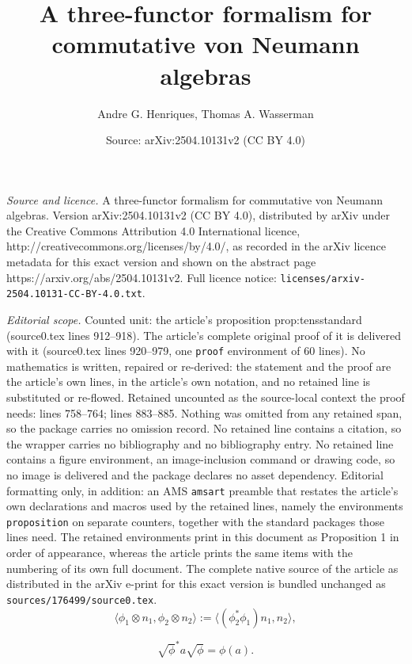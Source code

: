 \documentclass[10pt,a4paper]{amsart}
\title{A three-functor formalism for commutative von Neumann algebras}
\author{Andre G. Henriques, Thomas A. Wasserman}
\date{Source: arXiv:2504.10131v2 (CC BY 4.0)}
\begin{document}
\maketitle

\noindent\emph{Source and licence.} A three-functor formalism for commutative von Neumann algebras. Version arXiv:2504.10131v2 (CC BY 4.0), distributed by arXiv under the Creative Commons Attribution 4.0 International licence, http://creativecommons.org/licenses/by/4.0/, as recorded in the arXiv licence metadata for this exact version and shown on the abstract page https://arxiv.org/abs/2504.10131v2. Full licence notice: \texttt{licenses/arxiv-2504.10131-CC-BY-4.0.txt}.\par\smallskip

\noindent\textit{Editorial scope.} Counted unit: the article's proposition prop:tensstandard (source0.tex lines 912--918). The article's complete original proof of it is delivered with it (source0.tex lines 920--979, one \texttt{proof} environment of 60 lines). No mathematics is written, repaired or re-derived: the statement and the proof are the article's own lines, in the article's own notation, and no retained line is substituted or re-flowed.  Retained uncounted as the source-local context the proof needs: lines 758--764; lines 883--885.  Nothing was omitted from any retained span, so the package carries no omission record.  No retained line contains a citation, so the wrapper carries no bibliography and no bibliography entry.  No retained line contains a figure environment, an image-inclusion command or drawing code, so no image is delivered and the package declares no asset dependency.  Editorial formatting only, in addition: an AMS \texttt{amsart} preamble that restates the article's own declarations and macros used by the retained lines, namely the environments \texttt{proposition} on separate counters, together with the standard packages those lines need.  The retained environments print in this document as Proposition 1 in order of appearance, whereas the article prints the same items with the numbering of its own full document.  The complete native source of the article as distributed in the arXiv e-print for this exact version is bundled unchanged as \texttt{sources/176499/source0.tex}.
\begin{equation}\label{e:innerprodonfusion}
    \langle
\phi_1\otimes n_1,\phi_2\otimes n_2
\rangle:=\langle (\phi_2^*\phi_1)
n_1,n_2
\rangle,
\end{equation} 

\begin{equation}\label{last eq}
\sqrt{\phi}^* a \sqrt{\phi} = \phi(a).
\end{equation}
\end{document}
